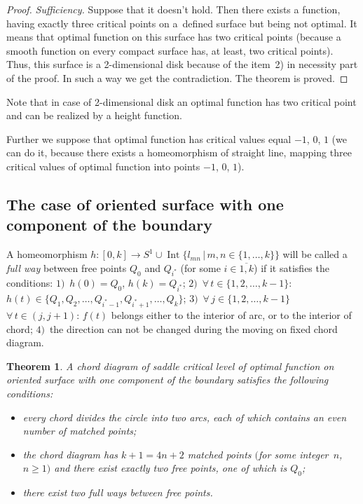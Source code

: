 \documentclass[10pt,a4paper]{amsart}
\numberwithin{equation}{section}
\newtheorem{Theorem}{Theorem}[section]
\begin{document}
\begin{proof}
\emph{Sufficiency.} Suppose that it doesn't hold. Then there exists a function, having exactly three critical points on a~def\/ined surface but being not optimal. It means that optimal function on this surface has two critical points (because a smooth function on every compact surface has, at least, two critical points). Thus, this surface is a 2-dimensional disk because of the item~2) in necessity part of the proof. In such a way we get the contradiction. The theorem is proved.
\end{proof}

Note that in case of 2-dimensional disk an optimal function has two critical point and can be realized by a height function.

Further we suppose that optimal function has critical values equal $-1$, $0$, $1$ (we can do it, because there exists a homeomorphism of straight line, mapping three critical values of optimal function into points $-1$, $0$, $1$).

\subsection{The case of oriented surface with one component of the boundary}

\begin{Definition}\label{definition4.2}
A homeomorphism $h\colon [0,k] \rightarrow S^{1}\cup \operatorname{Int}\{l_{mn}\,|\,m,n\in\{1,\ldots,k\}\}$ will be called a \emph{full way} between free points $Q_{0}$ and $Q_{i^{*}}$ (for some $i\in\overline{1,k}$) if it satisf\/ies the conditions: $1)$~$h(0)=Q_{0}$, $h(k)=Q_{i^{*}}$; $2)$~$\forall\, t\in\{1,2,\ldots,k-1\}$: $h(t)\in\{Q_{1},Q_{2},\ldots,Q_{i^{*}-1},Q_{i^{*}+1},\ldots,Q_{k}\}$; $3)$~$\forall\, j\in\{1,2,\ldots,k-1\}$ $\forall\, t\in(j,j+1)$: $f(t)$ belongs either to the interior of arc, or to the interior of chord; $4)$~the direction can not be changed during the moving on f\/ixed chord diagram.
\end{Definition}

\begin{Theorem}\label{theorem4.2}
A chord diagram of saddle critical level of optimal function on oriented surface with one component of the boundary satisfies the following conditions:
\begin{itemize}\itemsep=0pt
\item[$1)$] every chord divides the circle into two arcs, each of which contains an even number of matched points;
\item[$2)$] the chord diagram has $k+1=4n+2$ matched points $($for some integer~$n$, $n\geq1)$ and there exist exactly two free points, one of which is $Q_{0}$;
\item[$3)$] there exist two full ways between free points.
\end{itemize}
\end{Theorem}
\end{document}
